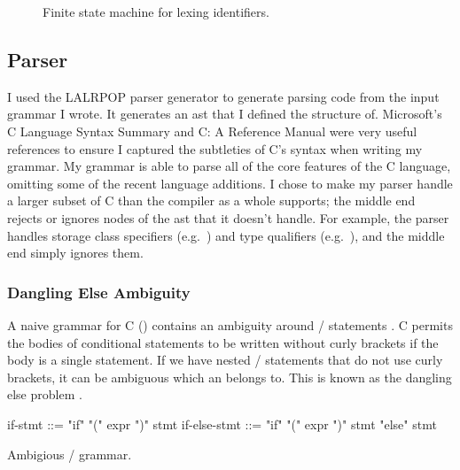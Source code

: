 \documentclass[00-main.tex]{subfiles}
\begin{document}
\begin{figure}[!htb]
  \centering
  \caption{Finite state machine for lexing identifiers.}
  \label{fig:lexing identifiers fsm} %
\end{figure}


\subsection{Parser}

I used the LALRPOP parser generator  to generate parsing code from the input grammar I wrote.
It generates an \gls{ast} that I defined the structure of.
Microsoft's C Language Syntax Summary  and C: A Reference Manual  were very useful references to ensure I captured the subtleties of C's syntax when writing my grammar. %
My grammar is able to parse all of the core features of the C language, omitting some of the recent language additions. I chose to make my parser handle a larger subset of C than the compiler as a whole supports; the middle end rejects or ignores nodes of the \gls{ast} that it doesn't handle. For example, the parser handles storage class specifiers (e.g.\ ) and type qualifiers (e.g.\ ), and the middle end simply ignores them.

\subsubsection{Dangling Else Ambiguity}

A naive grammar for C () contains an ambiguity around / statements .
C permits the bodies of conditional statements to be written without curly brackets if the body is a single statement.
If we have nested / statements that do not use curly brackets, it can be ambiguous which  an  belongs to. This is known as the dangling else problem .

\begin{listing}[!ht]
  \begin{GrammarListing}
    if-stmt      ::= "if" "(" expr ")" stmt
    if-else-stmt ::= "if" "(" expr ")" stmt "else" stmt
  \end{GrammarListing}
  \caption{Ambigious / grammar.}
  \label{lst:ambiguous if-else grammar}
\end{listing}
\end{document}
